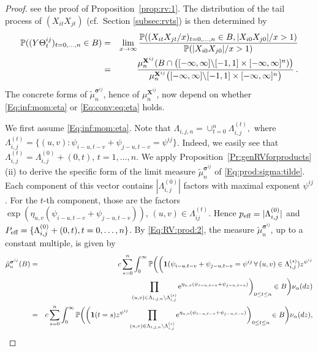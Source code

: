 \begin{proof}
\eeam
 see the proof of 
Proposition~\ref{prop:rv:1}. The distribution of the tail process of $(X_{it}X_{jt})$ (cf.\ Section \ref{subsec:rvts}) is then determined by
\begin{eqnarray}\label{Eq:theta:law} {\mathbb P}((Y \Theta^{ij}_t)_{t=0, \ldots, n} \in B)&=&\lim_{x \to \infty} \frac{{\mathbb P}((X_{it}X_{jt}/x)_{t=0, \ldots, n} \in B, |X_{i0}X_{j0}|/x>1)}{{\mathbb P}(|X_{i0}X_{j0}|/x>1)}\\
\nonumber &=&\frac{\mu_n^{{\bf X}^{ij}}(B \cap \big([-\infty,\infty]\backslash [-1,1]\times 
[-\infty,\infty]^n)\big)}{\mu_n^{{\bf X}^{ij}}\big([-\infty,\infty]\backslash [-1,1]\times [-\infty,\infty]^n\big)}\,.
\end{eqnarray}
The concrete forms of $\tilde{\mu}_n^{\boldsymbol{\sigma}^{ij}}$, hence of $\mu_n^{\mathbf{X}^{ij}}$, 
now depend on whether \eqref{Eq:inf:mom:eta} or \eqref{Eq:conv:eq:eta} holds.
\par
We first assume \eqref{Eq:inf:mom:eta}. Note that
$\Lambda_{i,j,n}=\cup_{t=0}^n \Lambda_{i,j}^{(t)},$ where $\Lambda_{i,j}^{(t)}=\{(u,v): \psi_{i-u,t-v}+\psi_{j-u,t-v}=\psi^{ij}\}$. Indeed, 
we easily see that $\Lambda_{i,j}^{(t)}=\Lambda_{i,j}^{(0)}+(0,t)$, $t=1, \ldots, n$. 
We apply Proposition~\ref{Pr:genRVforproducts}(ii) 
to derive the specific form of the limit measure $\tilde{\mu}_n^{\boldsymbol{\sigma}^{ij}}$ of \eqref{Eq:prod:sigma:tilde}. 
Each component of this vector contains $|\Lambda_{i,j}^{(0)}|$ factors 
with maximal exponent $\psi^{ij}$. For the $t$-th component, those are the factors 
$\exp(\eta_{u,v}(\psi_{i-u,t-v}+\psi_{j-u,t-v}))$, $(u,v) \in \Lambda_{ij}^{(t)}$. Hence $p_{\mbox{\scriptsize eff}}=|\Lambda_{i,j}^{(0)}|$ and 
$P_{\mbox{\scriptsize eff}}=\{\Lambda_{i,j}^{(0)}+(0,t), t=0, \ldots, n\}$. By \eqref{Eq:RV:prod:2}, 
the measure $\tilde{\mu}^{\boldsymbol{\sigma}^{ij}}_n$, up to a constant multiple, is given by
\begin{eqnarray*}
 \tilde{\mu}^{\boldsymbol{\sigma}^{ij}}_n(B)&=& c \sum_{s=0}^n \int_0^\infty \P\bigg(\bigg(\I(\psi_{i-u,t-v}+\psi_{j-u,t-v}=\psi^{ij} \, \forall\, (u,v) \in \Lambda_{i,j}^{(s)})z^{\psi^{ij}}\\
 && \hspace{1.7cm} \prod_{(u,v) \in \Lambda_{i,j,n} \setminus \Lambda_{i,j}^{(s)}}\ex^{\eta_{u,v}(\psi_{i-u,t-v}+\psi_{j-u,t-v})}\bigg)_{0 \leq t \leq n} \in B\bigg)\nu_{\alpha}(dz)\\
 &=& c \sum_{s=0}^n \int_0^\infty \P\bigg(\bigg(\I(t=s)z^{\psi^{ij}}\prod_{(u,v) \in \Lambda_{i,j,n} \setminus \Lambda_{i,j}^{(s)}}\ex^{\eta_{u,v}(\psi_{i-u,t-v}+\psi_{j-u,t-v})}\bigg)_{0 \leq t \leq n} \in B\bigg)\nu_{\alpha}(dz),

\end{eqnarray*}
\end{proof}
